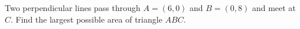 Two perpendicular lines pass through $A=(6,0)$ and $B=(0,8)$ and meet at $C$. Find the largest possible area of triangle $ABC$.
